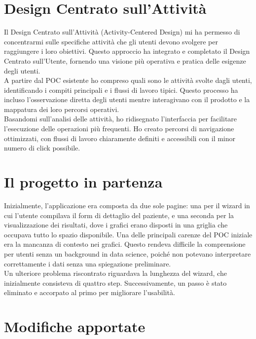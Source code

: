 \section{Design Centrato sull'Attività}

Il Design Centrato sull'Attività (Activity-Centered Design) mi ha permesso di concentrarmi sulle specifiche attività che gli utenti devono svolgere per raggiungere i loro obiettivi. Questo approccio ha integrato e completato il Design Centrato sull'Utente, fornendo una visione più operativa e pratica delle esigenze degli utenti.\\

A partire dal POC esistente ho compreso quali sono le attività svolte dagli utenti, identificando i compiti principali e i flussi di lavoro tipici. Questo processo ha incluso l'osservazione diretta degli utenti mentre interagivano con il prodotto e la mappatura dei loro percorsi operativi.\\
Basandomi sull'analisi delle attività, ho ridisegnato l'interfaccia per facilitare l'esecuzione delle operazioni più frequenti. Ho creato percorsi di navigazione ottimizzati, con flussi di lavoro chiaramente definiti e accessibili con il minor numero di click possibile. 


\section{Il progetto in partenza}
Inizialmente, l'applicazione era composta da due sole pagine: una per il wizard in cui l'utente compilava il form di dettaglio del paziente, e una seconda per la visualizzazione dei risultati, dove i grafici erano disposti in una griglia che occupava tutto lo spazio disponibile. Una delle principali carenze del POC iniziale era la mancanza di contesto nei grafici. Questo rendeva difficile la comprensione per utenti senza un background in data science, poiché non potevano interpretare correttamente i dati senza una spiegazione preliminare.\\

Un ulteriore problema riscontrato riguardava la lunghezza del wizard, che inizialmente consisteva di quattro step. Successivamente, un passo è stato eliminato e accorpato al primo per migliorare l'usabilità.

\section{Modifiche apportate}

